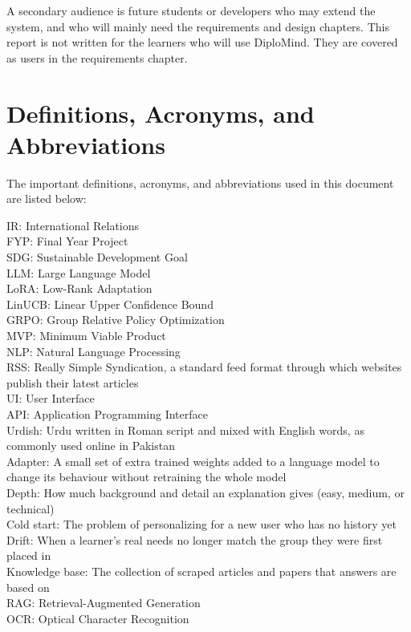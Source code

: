 \documentclass{FastFyp}
\begin{document}
A secondary audience is future students or developers who may extend the system, and who will mainly need the requirements and design chapters. This report is not written for the learners who will use DiploMind. They are covered as users in the requirements chapter.
\section{Definitions, Acronyms, and Abbreviations}
The important definitions, acronyms, and abbreviations used in this document are listed below:

IR: International Relations\\
FYP: Final Year Project\\
SDG: Sustainable Development Goal\\
LLM: Large Language Model\\
LoRA: Low-Rank Adaptation\\
LinUCB: Linear Upper Confidence Bound\\
GRPO: Group Relative Policy Optimization\\
MVP: Minimum Viable Product\\
NLP: Natural Language Processing\\
RSS: Really Simple Syndication, a standard feed format through which websites publish their latest articles\\
UI: User Interface\\
API: Application Programming Interface\\
Urdish: Urdu written in Roman script and mixed with English words, as commonly used online in Pakistan\\
Adapter: A small set of extra trained weights added to a language model to change its behaviour without retraining the whole model\\
Depth: How much background and detail an explanation gives (easy, medium, or technical)\\
Cold start: The problem of personalizing for a new user who has no history yet\\
Drift: When a learner's real needs no longer match the group they were first placed in\\
Knowledge base: The collection of scraped articles and papers that answers are based on\\
RAG: Retrieval-Augmented Generation\\
OCR: Optical Character Recognition
\end{document}
